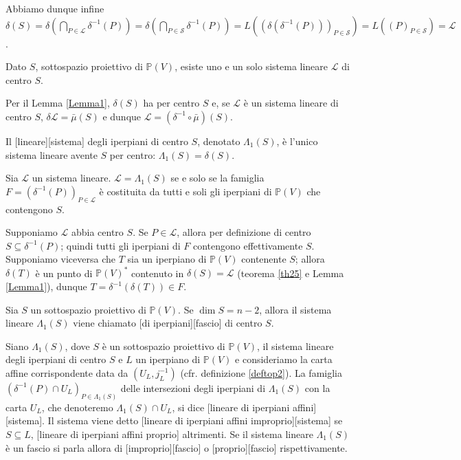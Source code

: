 \par Abbiamo dunque infine $\delta(S) = \delta(\bigcap_{P \in \mathcal{L}} \delta^{-1}(P)) = \delta(\bigcap_{P \in \mathcal{S}} \delta^{-1}(P)) = L((\delta(\delta^{-1}(P)))_{P \in \mathcal{S}}) = L((P)_{P \in \mathcal{S}}) = \mathcal{L}$. \EndProof
\begin{Theorem}\label{th28}
	Dato $S$, sottospazio proiettivo di $\mathbb{P}(V)$, esiste uno e un solo sistema lineare $\mathcal{L}$ di centro $S$.
\end{Theorem}
\Proof Per il Lemma \ref{Lemma1}, $\delta(S)$ ha per centro $S$ e, se $\mathcal{L}$ \`e un sistema lineare di centro $S$, $\delta{\mathcal{L}} = \bar{\mu}(S)$ e dunque $\mathcal{L} = (\delta^{-1} \circ \bar{\mu})(S)$. \EndProof
\begin{Definition}\label{def30}
	Il [lineare][sistema] degli iperpiani di centro $S$, denotato $\Lambda_1(S)$, \`e l'unico sistema lineare avente $S$ per centro: $\Lambda_1(S) = \delta(S)$.
\end{Definition}
\begin{Theorem}\label{th29}
	Sia $\mathcal{L}$ un sistema lineare. $\mathcal{L} = \Lambda_1(S)$ se e solo se la famiglia $F = (\delta^{-1}(P))_{P \in \mathcal{L}}$ \`e costituita da tutti e soli gli iperpiani di $\mathbb{P}(V)$ che contengono $S$.
\end{Theorem}
\Proof Supponiamo $\mathcal{L}$ abbia centro $S$. Se $P \in \mathcal{L}$, allora per definizione di centro $S \subseteq \delta^{-1}(P)$; quindi tutti gli iperpiani di $F$ contengono effettivamente $S$. Supponiamo viceversa che $T$ sia un iperpiano di $\mathbb{P}(V)$ contenente $S$; allora $\delta(T)$ \`e un punto di $\mathbb{P}(V)^*$ contenuto in $\delta(S) = \mathcal{L}$ (teorema \ref{th25} e Lemma \ref{Lemma1}), dunque $T = \delta^{-1}(\delta(T)) \in F$. \EndProof
\begin{Definition}\label{def31}
	Sia $S$ un sottospazio proiettivo di $\mathbb{P}(V)$. Se $\dim S = n - 2$, allora il sistema lineare $\Lambda_1(S)$ viene chiamato [di iperpiani][fascio] di centro $S$.
\end{Definition}
\begin{Definition}\label{def37}
	Siano $\Lambda_1(S)$, dove $S$ \`e un sottospazio proiettivo di $\mathbb{P}(V)$, il sistema lineare degli iperpiani di centro $S$ e $L$ un iperpiano di $\mathbb{P}(V)$ e consideriamo la carta affine corrispondente data da $(U_L, j_L^{-1})$ (cfr. definizione \ref{deftop2}). La famiglia $(\delta^{-1}(P) \cap U_L)_{P \in \Lambda_1(S)}$ delle intersezioni degli iperpiani di $\Lambda_1(S)$ con la carta $U_L$, che denoteremo $\Lambda_1(S) \cap U_L$, si dice [lineare di iperpiani affini][sistema]. Il sistema viene detto [lineare di iperpiani affini improprio][sistema] se $S \subseteq L$, [lineare di iperpiani affini proprio] altrimenti. Se il sistema lineare $\Lambda_1(S)$ \`e un fascio si parla allora di [improprio][fascio] o [proprio][fascio] rispettivamente.
\end{Definition}
